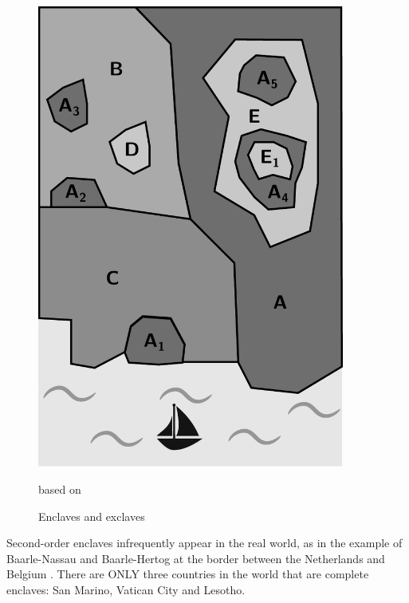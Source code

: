 \begin{minipage}[t]{0.35\textwidth}

\vspace{-2em}
\begin{figure}[H]
  \centering
  \includegraphics[width=0.9\textwidth]{graphics/basics/countries/enclaves_exclaves}
  \caption{Enclaves and exclaves}
  \small{based on \cite{enclavesexclavesfigure}}
  \label{fig:enclaves_exclaves}
\end{figure}

\end{minipage}    %

Second-order enclaves infrequently appear in the real world, as in the example of Baarle-Nassau and Baarle-Hertog at the border between the Netherlands and Belgium \cite{baarlebaarle}. There are ONLY three countries in the world that are complete enclaves: San Marino, Vatican City and Lesotho.


